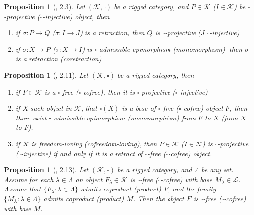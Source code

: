 \documentclass[12pt]{article}
\newtheorem{proposition}[theorem]{Proposition}
\begin{document}
\begin{proposition}[\cite{HelMetrFrQmod}, 2.3]\label{PrRetractsProjInj} 
Let $(\mathcal{K},\square)$ be a rigged category, and $P\in\mathcal{K}$ 
($I\in\mathcal{K}$) be $\square$-projective ($\square$-injective) object, 
then
\begin{enumerate}[label = (\roman*)]
    \item  if $\sigma:P\to Q$ ($\sigma:I\to J$) is a retraction, 
    then $Q$ is $\square$-projective ($J$ $\square$-injective)

    \item if $\sigma:X\to P$ ($\sigma:X\to I$) is $\square$-admissible 
    epimorphism (monomorphism), then $\sigma$ is a retraction (coretraction)
\end{enumerate}
\end{proposition}

\begin{proposition}[\cite{HelMetrFrQmod}, 2.11]\label{PrFrCoFrProjInjObjProp} 
Let $(\mathcal{K},\square)$ be a rigged category, then

\begin{enumerate}[label = (\roman*)]
    \item if $F\in\mathcal{K}$ is a $\square$-free ($\square$-cofree), 
    then it is $\square$-projective ($\square$-injective)

    \item if $X$ such object in $\mathcal{K}$, that $\square(X)$ is a base of 
    $\square$-free ($\square$-cofree) object $F$, then there exist 
    $\square$-admissible epimorphism (monomorphism) from $F$ to $X$ 
    (from $X$ to $F$).

    \item if $\mathcal{K}$ is freedom-loving (cofreedom-loving), 
    then $P\in\mathcal{K}$ ($I\in\mathcal{K}$) is $\square$-projective 
    ($\square$-injective) if and only if it is a retract of $\square$-free 
    ($\square$-cofree) object.
\end{enumerate}
\end{proposition}

\begin{proposition}[\cite{HelMetrFrQmod}, 2.13]\label{PrCoprodFrIsFr} 
Let $(\mathcal{K},\square)$ be a rigged category, and $\Lambda$ be any set. 
Assume for each $\lambda \in \Lambda$ an object $F_{\lambda} \in \mathcal{K}$ 
is $\square$-free ($\square$-cofree) with base $M_{\lambda} \in \mathcal{L}$. 
Assume that $ \{ F_\lambda:\lambda \in \Lambda \}$ 
admits coproduct (product) $F$, and the family 
$ \{ M_\lambda:\lambda \in \Lambda \}$ admits coproduct 
(product) $M$. Then the object $F$ is $\square$-free ($\square$-cofree) 
with base $M$.
\end{proposition}
\end{document}
